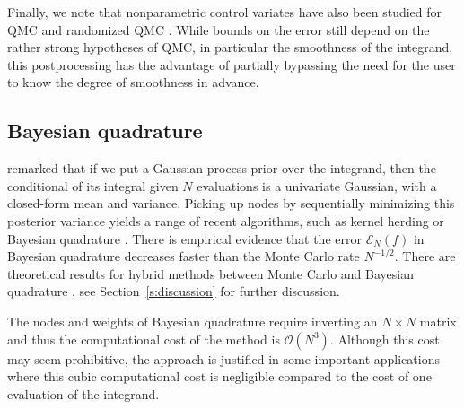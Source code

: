 \documentclass[a4paper,11pt]{article}
\numberwithin{equation}{section}
\theoremstyle{definition}
\newcommand{\rev}[1]{#1}
\newcommand{\cO}{\mathcal{O}}
\def\cE{\mathscr{E}}
\begin{document}
\rev{Finally, we note that nonparametric control variates have also been studied for QMC and randomized QMC \citep{OaGi16}. While bounds on the error still depend on the rather strong hypotheses of QMC, in particular the smoothness of the integrand, this postprocessing has the advantage of partially bypassing the need for the user to know the degree of smoothness in advance.}


\subsection{Bayesian quadrature}
\label{s:bq}
\cite{Hag91} remarked that if we put a Gaussian process prior \citep{RaWi06} over the integrand, then the conditional of its integral given $N$ evaluations is a univariate Gaussian, with a closed-form mean and variance. Picking up nodes by sequentially minimizing this posterior variance yields a range of recent algorithms, such as kernel herding \citep{ChWeSm10} or Bayesian quadrature \citep{HuDu12}. There is empirical evidence \citep{HuDu12} that the error $\cE_N(f)$ in Bayesian quadrature decreases faster than the Monte Carlo rate $N^{-1/2}$. There are theoretical results for hybrid methods between Monte Carlo and Bayesian quadrature \citep{BOGO15}, see Section~\ref{s:discussion} for further discussion.

The nodes and weights of Bayesian quadrature require inverting an $N\times N$ matrix and thus the computational cost of the method is $\cO(N^3)$. Although this cost may seem prohibitive, the approach is justified in some important applications where this cubic computational cost is negligible compared to the cost of one evaluation of the integrand.


\end{document}
